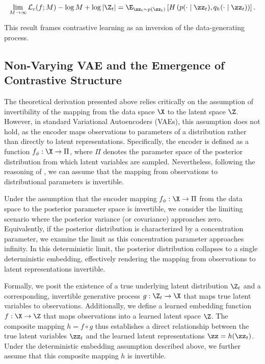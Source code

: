 \begin{equation}
    \label{eq:Contr}
    \lim_{M \rightarrow \infty} \mathcal{L}_{c}(f; M) - \log M + \log |\Z_t| =
    \E_{\zz_t \sim p(\zz_t)}\left[H\left(p(\cdot \mid \zz_t), q_h(\cdot \mid \zz_t)\right)\right].
\end{equation}

This result frames contrastive learning as an inversion of the data-generating process.

\subsection{Non-Varying VAE and the Emergence of Contrastive Structure}

The theoretical derivation presented above relies critically on the assumption of invertibility of the mapping from the data space $\X$ to the latent space $\Z$. However, in standard Variational Autoencoders (VAEs), this assumption does not hold, as the encoder maps observations to parameters of a distribution rather than directly to latent representations. Specifically, the encoder is defined as a function $f_{\phi}: \X \rightarrow \Pi$, where $\Pi$ denotes the parameter space of the posterior distribution from which latent variables are sampled. Nevertheless, following the reasoning of \citet{Zimmermann2021-ax}, we can assume that the mapping from observations to distributional parameters is invertible.

Under the assumption that the encoder mapping $f_{\phi}: \X \rightarrow \Pi$ from the data space to the posterior parameter space is invertible, we consider the limiting scenario where the posterior variance (or covariance) approaches zero. Equivalently, if the posterior distribution is characterized by a concentration parameter, we examine the limit as this concentration parameter approaches infinity. In this deterministic limit, the posterior distribution collapses to a single deterministic embedding, effectively rendering the mapping from observations to latent representations invertible.

Formally, we posit the existence of a true underlying latent distribution $\Z_t$ and a corresponding, invertible generative process $g: \Z_t \rightarrow \X$ that maps true latent variables to observations. Additionally, we define a learned embedding function $f: \X \rightarrow \Z$ that maps observations into a learned latent space $\Z$. The composite mapping $h = f \circ g$ thus establishes a direct relationship between the true latent variables $\zz_t$ and the learned latent representations $\zz = h(\zz_t)$. Under the deterministic embedding assumption described above, we further assume that this composite mapping $h$ is invertible.

